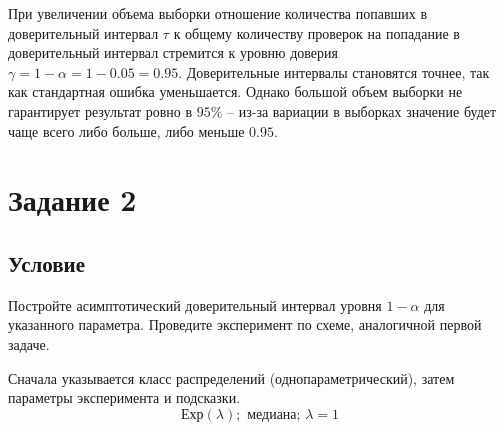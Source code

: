 \documentclass[a4paper, 12pt]{article}
\begin{document}
    При увеличении объема выборки отношение количества попавших в доверительный интервал $\tau$ к общему
    количеству проверок на попадание в доверительный интервал стремится к уровню доверия $\gamma=1-\alpha=1-0.05=0.95$.
    Доверительные интервалы становятся точнее, так как стандартная ошибка уменьшается. Однако большой
    объем выборки не гарантирует результат ровно в $95\%$ -- из-за вариации в выборках значение будет
    чаще всего либо больше, либо меньше $0.95$.


    \section{Задание 2}
    \subsection{Условие}
    Постройте асимптотический доверительный интервал уровня $1-\alpha$ для указанного параметра.
    Проведите эксперимент по схеме, аналогичной первой задаче.
    
    
    Сначала указывается класс распределений (однопараметрический),
    затем параметры эксперимента и подсказки.
    $$\text{Ехр}(\lambda);\text{ медиана};\,\lambda=1$$
\end{document}
